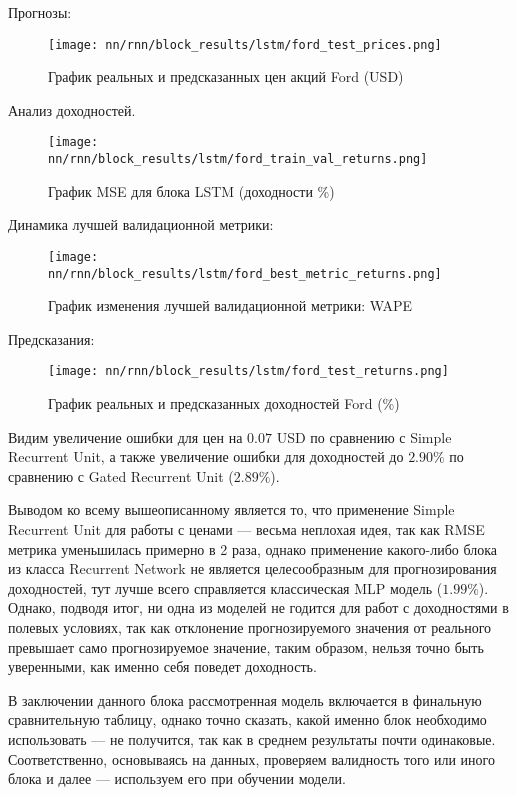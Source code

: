  \noindent Прогнозы:
 \begin{figure}[H]
 	\centering
 	\texttt{[image: nn/rnn/block\_results/lstm/ford\_test\_prices.png]}
 	\caption{График реальных и предсказанных цен акций Ford (USD)}
 	\label{fig::lstm_ford_test_prices}
 \end{figure}
 \noindent Анализ доходностей.
 \begin{figure}[H]
 	\centering
 	\texttt{[image: nn/rnn/block\_results/lstm/ford\_train\_val\_returns.png]}
 	\caption{График MSE для блока LSTM (доходности \%)}
 	\label{fig::lstm_ford_train_val_returns}
 \end{figure}
 \noindent Динамика лучшей валидационной метрики:
 \begin{figure}[H]
 	\centering
 	\texttt{[image: nn/rnn/block\_results/lstm/ford\_best\_metric\_returns.png]}
 	\caption{График изменения лучшей валидационной метрики: WAPE}
 	\label{fig::lstm_ford_best_metric_returns}
 \end{figure}
 \noindent Предсказания:
 \begin{figure}[H]
 	\centering
 	\texttt{[image: nn/rnn/block\_results/lstm/ford\_test\_returns.png]}
 	\caption{График реальных и предсказанных доходностей Ford (\%)}
 	\label{fig::lstm_ford_test_returns}
 \end{figure}
 Видим увеличение ошибки для цен на $0.07$ USD по сравнению с Simple Recurrent Unit, а также увеличение ошибки для доходностей до $2.90\%$ по сравнению с Gated Recurrent Unit ($2.89\%$).
 
 Выводом ко всему вышеописанному является то, что применение Simple Recurrent Unit для работы с ценами --- весьма неплохая идея, так как RMSE метрика уменьшилась примерно в 2 раза, однако применение какого-либо блока из класса Recurrent Network не является целесообразным для прогнозирования доходностей, тут лучше всего справляется классическая MLP модель ($1.99\%$). Однако, подводя итог, ни одна из моделей не годится для работ с доходностями в полевых условиях, так как отклонение прогнозируемого значения от реального превышает само прогнозируемое значение, таким образом, нельзя точно быть уверенными, как именно себя поведет доходность.
 
 В заключении данного блока рассмотренная модель включается в финальную сравнительную таблицу, однако точно сказать, какой именно блок необходимо использовать --- не получится, так как в среднем результаты почти одинаковые. Соответственно, основываясь на данных, проверяем валидность того или иного блока и далее --- используем его при обучении модели.